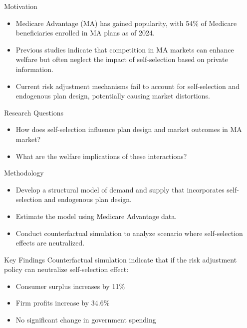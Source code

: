 \documentclass[professionalfonts, aspectratio=169]{beamer}
\begin{document}
\begin{frame}{Motivation}
  \begin{itemize}
    \item Medicare Advantage (MA) has gained popularity, with 54\% of Medicare beneficiaries enrolled in MA plans as of 2024.
    \item Previous studies indicate that competition in MA markets can enhance welfare but often neglect the impact of self-selection based on private information.
    \item Current risk adjustment mechanisms fail to account for self-selection and endogenous plan design, potentially causing market distortions.
  \end{itemize}
\end{frame}

\begin{frame}{Research Questions}
  \begin{itemize}
    \item How does self-selection influence plan design and market outcomes in MA market?
    \item What are the welfare implications of these interactions?
  \end{itemize}
\end{frame}

\begin{frame}{Methodology}
  \begin{itemize}
    \item Develop a structural model of demand and supply that incorporates self-selection and endogenous plan design.
    \item Estimate the model using Medicare Advantage data.
    \item Conduct counterfactual simulation to analyze scenario where self-selection effects are neutralized.
  \end{itemize}
\end{frame}

\begin{frame}{Key Findings}
  Counterfactual simulation indicate that if the risk adjustment policy can neutralize self-selection effect:
  \begin{itemize}
    \item Consumer surplus increases by 11\%
    \item Firm profits increase by 34.6\%
    \item No significant change in government spending
  \end{itemize}
\end{frame}
\end{document}
